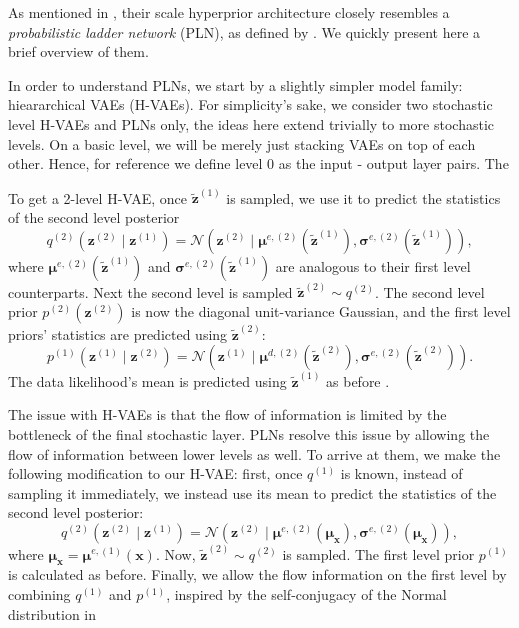 \documentclass{article}
\renewcommand{\vec}[1]{\mathbf{#1}}
\newcommand{\Norm}[1]{\mathcal{N}\left( #1 \right)}
\newcommand{\MU}{\boldsymbol\mu}
\newcommand{\SIGMA}{\boldsymbol\sigma}
\begin{document}
\par
As mentioned in \cite{balle2018variational}, their scale hyperprior architecture
closely resembles a \textit{probabilistic ladder network} (PLN), as defined by
\cite{sonderby2016train}. We quickly present here a brief overview of them.
\par
In order to understand PLNs, we start by a slightly simpler model family:
hieararchical VAEs (H-VAEs). For simplicity's sake, we consider two stochastic
level H-VAEs and PLNs only, the ideas here extend trivially to more stochastic levels.
On a basic level, we will be merely just stacking VAEs on top of each other.
Hence, for reference we define level 0 as the input - output layer pairs. The
\par
To get a 2-level H-VAE, once $\vec{\tilde{z}}^{(1)}$ is sampled, we use it to predict
the statistics of the second level posterior
\[
  q^{(2)}(\vec{z}^{(2)} \mid \vec{z}^{(1)}) = \Norm{\vec{z}^{(2)} \mid 
  \MU^{e, (2)}(\vec{\tilde{z}}^{(1)}), \SIGMA^{e, (2)}(\vec{\tilde{z}}^{(1)})},
\]
where $\MU^{e, (2)}(\vec{\tilde{z}}^{(1)})$ and
$\SIGMA^{e, (2)}(\vec{\tilde{z}}^{(1)})$ are analogous to their first level
counterparts. Next the second level is sampled $\vec{\tilde{z}}^{(2)} \sim
q^{(2)}$. The second level prior $p^{(2)}(\vec{z}^{(2)})$ is now the diagonal
unit-variance Gaussian, and the first level priors' statistics are predicted
using $\vec{\tilde{z}}^{(2)}$:
\[
  p^{(1)}(\vec{z}^{(1)} \mid \vec{z}^{(2)}) =
  \Norm{\vec{z}^{(1)} \mid \MU^{d, (2)}(\vec{\tilde{z}}^{(2)}),
    \SIGMA^{e, (2)}(\vec{\tilde{z}}^{(2)})}.
\] 
The data likelihood's mean is predicted using $\vec{\tilde{z}}^{(1)}$ as before
\cite{sonderby2016train}.
\par
The issue with H-VAEs is that the flow of information is limited by the
bottleneck of the final stochastic layer. PLNs resolve this issue by allowing
the flow of information between lower levels as well. To arrive at them, we
make the following modification to our H-VAE: first, once $q^{(1)}$ is known,
instead of sampling it immediately, we instead use its mean to predict the
statistics of the second level posterior:
\[
  q^{(2)}(\vec{z}^{(2)} \mid \vec{z}^{(1)}) = \Norm{\vec{z}^{(2)} \mid 
  \MU^{e, (2)}(\MU_{\vec{x}}), \SIGMA^{e, (2)}(\MU_{\vec{x}})},
\]
where $\MU_{\vec{x}} = \MU^{e, (1)}(\vec{x})$. Now, $\vec{\tilde{z}}^{(2)} \sim
q^{(2)}$ is sampled. The first level prior $p^{(1)}$ is calculated as before.
Finally, we allow the flow information on the first level by combining $q^{(1)}$
and $p^{(1)}$, inspired by the self-conjugacy of the Normal distribution in
\end{document}
